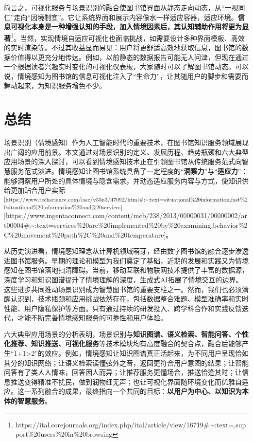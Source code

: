 \documentclass[
  letterpaper,
]{scrbook}
\begin{document}
简言之，可视化服务与场景识别的融合使图书馆界面从静态走向动态，从``一视同仁''走向``因境制宜''。它让系统界面和展示内容像水一样适应容器，适应环境。\textbf{信息可视化本身是一种增强认知的手段，加入情境因素后，其认知辅助作用将更为显著}\footnote{https://ital.corejournals.org/index.php/ital/article/view/16719\#:\textasciitilde:text=,support\%20users\%20in\%20browsing}。当然，实现情境自适应可视化也面临挑战，如需要设计多种界面模板、高效的实时渲染等。不过其收益显而易见：用户将更舒适高效地获取信息，图书馆的数据价值得以更充分地传达。例如，以前静态的数据报告可能无人问津，但现在通过一个根据读者兴趣实时变化的可视化仪表板，大家随时可以了解图书馆动态。可以说，情境感知为图书馆的信息可视化注入了``生命力''，让其随用户的脚步和需要而舞动起来，为知识服务增色不少。

\section{总结}\label{ux603bux7ed3}

场景识别（情境感知）作为人工智能时代的重要技术，在图书馆知识服务领域展现出广阔的应用前景。本文通过对场景识别的定义、发展历程、趋势瓶颈和六大典型应用场景的深入探讨，可以看到情境感知技术正在引领图书馆从传统服务范式向智慧服务范式演进。情境感知让图书馆系统具备了一定程度的``\textbf{洞察力}''与``\textbf{适应力}''：能够洞察用户所处的具体情境与隐含需求，并动态适应服务内容与方式，使知识供给更加贴合用户实际\textsuperscript{{[}https://www.techscience.com/iasc/v33n3/47092/html\#:\textasciitilde:text=situational\%20information,fast\%20situational\%20information\%20and\%20services{]}}{[}https://www.ingentaconnect.com/content/mcb/238/2013/00000031/00000002/art00004\#:\textasciitilde:text=services\%20are\%20implemented\%20by\%20examining,behavior\%2C\%20movement\%20path\%2C\%20and\%20temperature{]}。

从历史演进看，情境感知理念从计算机领域萌芽，经由数字图书馆的融合逐步渗透进图书馆服务。早期的理论和模型为我们奠定了基础，近期的发展和实践又为情境感知在图书馆落地扫清障碍。当前，移动互联和物联网技术提供了丰富的数据源，深度学习和知识图谱提升了情境理解的深度，生成式AI拓展了情境交互的边界。这些进步共同推动场景识别成为智慧图书馆的重要支柱之一。然而，我们也必须清醒认识到，技术瓶颈和应用挑战依然存在，包括数据整合难题、模型准确率和实时性能、用户隐私保护等方面。只有通过持续的研发投入、跨学科合作和实践反馈迭代，才能不断完善情境感知服务的可靠性和用户体验。

六大典型应用场景的分析表明，场景识别与\textbf{知识图谱、语义检索、智能问答、个性化推荐、知识推送、可视化服务}等技术模块均有高度融合的契合点，融合后能够产生``1+1\textgreater2''的效应。例如，情境感知让知识图谱真正活起来，为不同用户呈现恰如其分的知识网络；让语义检索读懂弦外之音，返回更符合用户意图的结果；让智能问答有了类人人情味，回答因人而异；让推荐服务更懂场合，推送恰逢其时；让信息推送变得精准不扰民，做到润物细无声；也让可视化界面随环境变化而优雅自适应。这一系列融合的成果，最终指向一个共同的目标：\textbf{以用户为中心、以知识为本体的智慧服务}。
\end{document}
